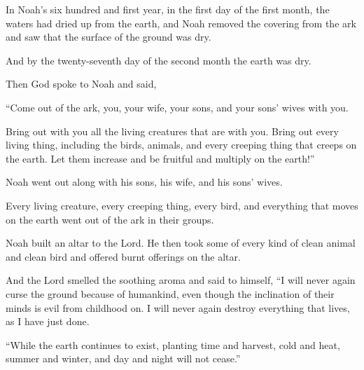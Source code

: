 \begin{scripture}
 In Noah's six hundred and first year, in the first day of the first month, the waters had dried up from the earth, and Noah removed the covering from the ark and saw that the surface of the ground was dry.
 And by the twenty-seventh day of the second month the earth was dry.
\everypar{}

 Then God spoke to Noah and said,
 ``Come out of the ark, you, your wife, your sons, and your sons' wives with you.
 Bring out with you all the living creatures that are with you. Bring out every living thing, including the birds, animals, and every creeping thing that creeps on the earth. Let them increase and be fruitful and multiply on the earth!''
\everypar{}

 Noah went out along with his sons, his wife, and his sons' wives.
 Every living creature, every creeping thing, every bird, and everything that moves on the earth went out of the ark in their groups.
\everypar{}

 Noah built an altar to the Lord. He then took some of every kind of clean animal and clean bird and offered burnt offerings on the altar.
 And the Lord smelled the soothing aroma and said to himself, ``I will never again curse the ground because of humankind, even though the inclination of their minds is evil from childhood on. I will never again destroy everything that lives, as I have just done.
\everypar{}

 ``While the earth continues to exist, planting time and harvest, cold and heat, summer and winter, and day and night will not cease.''


\end{scripture}
